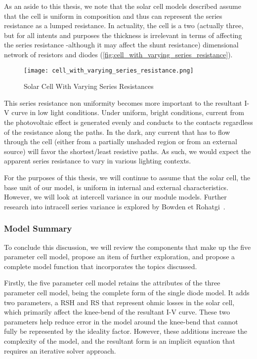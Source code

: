 As an aside to this thesis, we note that the solar cell models described assume
that the cell is uniform in composition and thus can represent the series
resistance as a lumped resistance. In actuality, the cell is a two (actually
three, but for all intents and purposes the thickness is irrelevant in terms of
affecting the series resistance -although it may affect the shunt resistance)
dimensional network of resistors and diodes
(\autoref{fig:cell_with_varying_series_resistance}).

\begin{figure}[!htbp]
    \centering
    \texttt{[image: cell\_with\_varying\_series\_resistance.png]}
    \caption{Solar Cell With Varying Series Resistances~\cite{pveducation_measurement_of_series_resistance}}
    \label{fig:cell_with_varying_series_resistance}
\end{figure}

This series resistance non uniformity becomes more important to the
resultant \ac{I-V} curve in low light conditions. Under uniform, bright
conditions, current from the photovoltaic effect is generated evenly and
conducts to the contacts regardless of the resistance along the paths. In the
dark, any current that has to flow through the cell (either from a partially
unshaded region or from an external source) will favor the shortest/least
resistive paths. As such, we would expect the apparent series resistance to vary
in various lighting contexts.

For the purposes of this thesis, we will continue to assume that the solar cell,
the base unit of our model, is uniform in internal and external characteristics.
However, we will look at intercell variance in our module models. Further
research into intracell series variance is explored by Bowden et
Rohatgi~\cite{bowden_et_rohatgi}.


\subsubsection{Model Summary}\label{subsubsec:five_param_model_summary}

To conclude this discussion, we will review the components that make up the
five parameter cell model, propose an item of further exploration, and propose a
complete model function that incorporates the topics discussed.

Firstly, the five parameter cell model retains the attributes of the three
parameter cell model, being the complete form of the single diode model. It adds
two parameters, a \acf{RSH} and \acf{RS} that represent ohmic losses in the
solar cell, which primarily affect the knee-bend of the resultant \ac{I-V}
curve. These two parameters help reduce error in the model around the knee-bend
that cannot fully be represented by the ideality factor. However, these
additions increase the complexity of the model, and the resultant form is an
implicit equation that requires an iterative solver approach.

